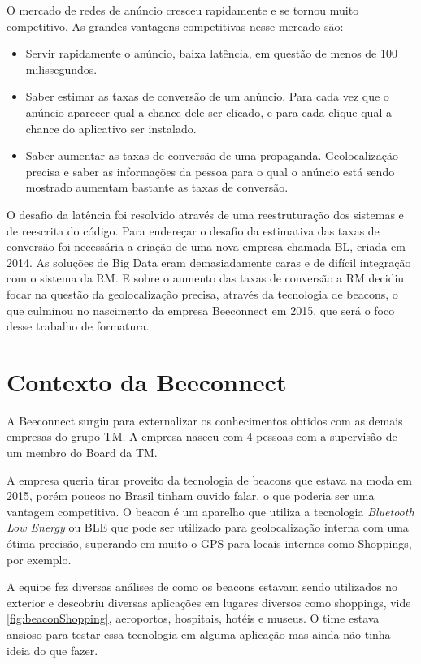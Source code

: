 O mercado de redes de anúncio cresceu rapidamente e se tornou muito competitivo. As grandes vantagens competitivas nesse mercado são:
\begin{itemize}
\item Servir rapidamente o anúncio, baixa latência, em questão de menos de 100 milissegundos.
\item Saber estimar as taxas de conversão de um anúncio. Para cada vez que o anúncio aparecer qual a chance dele ser clicado, e para cada clique qual a chance do aplicativo ser instalado.
\item Saber aumentar as taxas de conversão de uma propaganda. Geolocalização precisa e saber as informações da pessoa para o qual o anúncio está sendo mostrado aumentam bastante as taxas de conversão.
\end{itemize}

O desafio da latência foi resolvido através de uma reestruturação dos sistemas e de reescrita do código. Para endereçar o desafio da estimativa das taxas de conversão foi necessária a criação de uma nova empresa chamada BL, criada em 2014. As soluções de Big Data eram demasiadamente caras e de difícil integração com o sistema da RM. E sobre o aumento das taxas de conversão a RM decidiu focar na questão da geolocalização precisa, através da tecnologia de beacons, o que culminou no nascimento da empresa Beeconnect em 2015, que será o foco desse trabalho de formatura.

\section{Contexto da Beeconnect}
\label{cha:contexto_da_beeconnect}
A Beeconnect surgiu para externalizar os conhecimentos obtidos com as demais empresas do grupo TM. A empresa nasceu com 4 pessoas com a supervisão de um membro do Board da TM.

A empresa queria tirar proveito da tecnologia de beacons que estava na moda em 2015, porém poucos no Brasil tinham ouvido falar, o que poderia ser uma vantagem competitiva. O beacon é um aparelho que utiliza a tecnologia \textit{Bluetooth Low Energy} ou BLE que pode ser utilizado para geolocalização interna com uma ótima precisão, superando em muito o GPS para locais internos como Shoppings, por exemplo.

A equipe fez diversas análises de como os beacons estavam sendo utilizados no exterior e descobriu diversas aplicações em lugares diversos como shoppings, vide \autoref{fig:beaconShopping}, aeroportos, hospitais, hotéis e museus. O time estava ansioso para testar essa tecnologia em alguma aplicação mas ainda não tinha ideia do que fazer.

